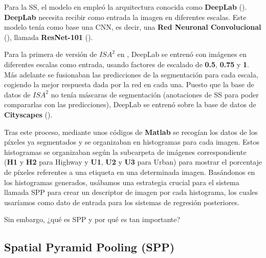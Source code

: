 Para la \ac{SS}, el modelo en \cite{isa2} empleó la arquitectura conocida como \textbf{DeepLab} (\cite{deeplab}). \textbf{DeepLab} necesita recibir como entrada la imagen en diferentes escalas. Este modelo tenía como base una \ac{CNN}, es decir, una \textbf{Red Neuronal Convolucional} (\cite{cnn}), llamada \textbf{ResNet-101} (\cite{resnet}).

Para la primera de versión de $ISA^{2}$ en \cite{isa2}, DeepLab se entrenó con imágenes en diferentes escalas como entrada, usando factores de escalado de \textbf{0.5}, \textbf{0.75} y \textbf{1}. Más adelante se fusionaban las predicciones de la segmentación para cada escala, cogiendo la mejor respuesta dada por la red en cada una. Puesto que la base de datos de $ISA^{2}$ no tenía máscaras de segmentación (anotaciones de \ac{SS} para poder compararlas con las predicciones), DeepLab se entrenó sobre la base de datos de \textbf{Cityscapes} (\cite{cityscapes}).
 


Tras este proceso, mediante unos códigos de \textbf{Matlab} se recogían los datos de los píxeles ya segmentados y se organizaban en histogramas para cada imagen. Estos histogramas se organizaban según la subcarpeta de imágenes correspondiente (\textbf{H1} y \textbf{H2} para Highway y \textbf{U1}, \textbf{U2} y \textbf{U3} para Urban) para mostrar el porcentaje de píxeles referentes a una etiqueta en una determinada imagen. Basándonos en los histogramas generados, usábamos una estrategia crucial para el sistema llamada \ac{SPP} para crear un descriptor de imagen por cada histograma, los cuales usaríamos como dato de entrada para los sistemas de regresión posteriores.

Sin embargo, ¿qué es \ac{SPP} y por qué es tan importante?

\subsection{Spatial Pyramid Pooling (SPP)}


